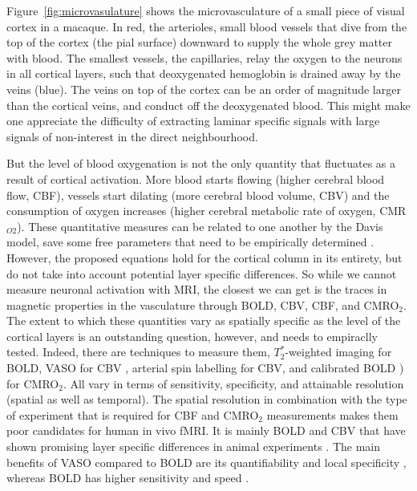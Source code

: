 Figure~\ref{fig:microvasulature} shows the microvasculature of a small piece of visual cortex in a macaque. In red, the arterioles, small blood vessels that dive from the top of the cortex (the pial surface) downward to supply the whole grey matter with blood. The smallest vessels, the capillaries, relay the oxygen to the neurons in all cortical layers, such that deoxygenated hemoglobin is drained away by the veins (blue). The veins on top of the cortex can be an order of magnitude larger than the cortical veins, and conduct off the deoxygenated blood. This might make one appreciate the difficulty of extracting laminar specific signals with large signals of non-interest in the direct neighbourhood. 


But the level of blood oxygenation is not the only quantity that fluctuates as a result of cortical activation. 
More blood starts flowing (higher cerebral blood flow, CBF), vessels start dilating (more cerebral blood volume, CBV) and the consumption of oxygen increases (higher cerebral metabolic rate of oxygen, CMR$_{O2}$). These quantitative measures can be related to one another by the Davis model, save some free parameters that need to be empirically determined \cite{Davis1997}. 
However, the proposed equations hold for the cortical column in its entirety, but do not take into account potential layer specific differences. So while we cannot measure neuronal activation with MRI, the closest we can get is the traces in magnetic properties in the vasculature through BOLD, CBV, CBF, and CMRO$_{2}$. The extent to which these quantities vary as spatially specific as the level of the cortical layers is an outstanding question, however, and needs to empiraclly tested. Indeed, there are techniques to measure them, $T_2^*$-weighted imaging \cite{Norris2006} for BOLD, VASO for CBV \cite{Huber2018}, arterial spin labelling \cite{Grade2015} for CBV, and calibrated BOLD \cite{Blockley2013}) for CMRO$_{2}$. All vary in terms of sensitivity, specificity, and attainable resolution (spatial as well as temporal). The spatial resolution in combination with the type of experiment that is required for CBF and CMRO$_2$ measurements makes them poor candidates for human in vivo fMRI. It is mainly BOLD and CBV that have shown promising layer specific differences in animal experiments \cite{Lu2004,Zhao2006,Jin2008,Goense2012}. The main benefits of VASO compared to BOLD are its quantifiability \cite{Lu2003} and local specificity \cite{Jin2006}, whereas BOLD has higher sensitivity and speed \cite{Huber2018}. %

